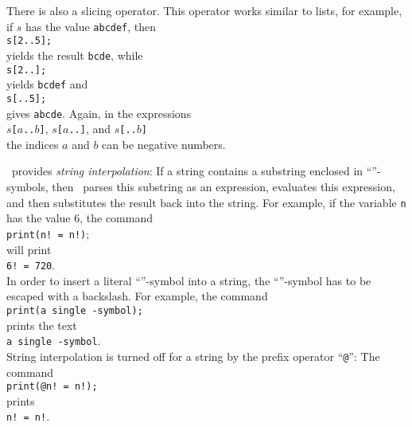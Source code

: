 There is also a slicing operator.  This operator works similar to lists, for example, if $s$ has the value 
\texttt{abcdef}, then 
\\[0.2cm]
\hspace*{1.3cm}
\texttt{s[2..5];}
\\[0.2cm]
yields the result \texttt{bcde}, while 
\\[0.2cm]
\hspace*{1.3cm}
\texttt{s[2..];}
\\[0.2cm]
yields \texttt{bcdef} and 
\\[0.2cm]
\hspace*{1.3cm}
\texttt{s[..5];}
\\[0.2cm]
gives \texttt{abcde}.  Again, in the expressions
\\[0.2cm]
\hspace*{1.3cm}
\texttt{$s$[$a$..$b$]}, \quad \texttt{$s$[$a$..]}, \quad and \quad \texttt{$s$[..$b$]}
\\[0.2cm]
the indices $a$ and $b$ can be negative numbers.

\setlx\ provides \emph{string interpolation}:
If a string contains a substring enclosed in ``\texttt{}''-symbols, then \setlx\ 
parses this substring as an expression, evaluates this expression, and then substitutes the result
back into the string.  For example, if the variable \texttt{n} has the value $6$, the command
\\[0.2cm]
\hspace*{1.3cm}
\texttt{print(n! = n!)};
\\[0.2cm]
will print
\\[0.2cm]
\hspace*{1.3cm}
\texttt{6! = 720}.
\\[0.2cm]
In order to insert a literal ``\texttt{}''-symbol into a string,  the
``\texttt{\symbol{36}}''-symbol has to be escaped with a backslash.  For example, the command
\\[0.2cm]
\hspace*{1.3cm}
\texttt{print(a single -symbol);}
\\[0.2cm]
prints the text
\\[0.2cm]
\hspace*{1.3cm}
\texttt{a single -symbol}.
\\[0.2cm]
String interpolation is turned off for a string by the prefix operator ``\texttt{@}'':
The command
\\[0.2cm]
\hspace*{1.3cm}
\texttt{print(@n! = n!);}
\\[0.2cm]
prints
\\[0.2cm]
\hspace*{1.3cm}
\texttt{n! = n!}.

